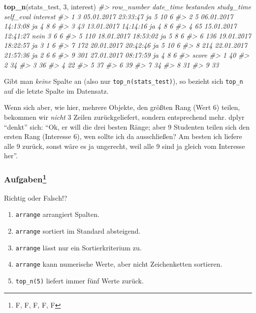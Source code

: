 \documentclass[12pt,ngerman,]{book}
\makeatletter
\newenvironment{Shaded}{\begin{snugshade}}{\end{snugshade}}
\newcommand{\KeywordTok}[1]{\textcolor[rgb]{0.13,0.29,0.53}{\textbf{#1}}}
\newcommand{\DecValTok}[1]{\textcolor[rgb]{0.00,0.00,0.81}{#1}}
\newcommand{\CommentTok}[1]{\textcolor[rgb]{0.56,0.35,0.01}{\textit{#1}}}
\newcommand{\NormalTok}[1]{#1}
\providecommand{\tightlist}{%
  \setlength{\itemsep}{0pt}\setlength{\parskip}{0pt}}
\let\rmarkdownfootnote\footnote%
\def\footnote{\protect\rmarkdownfootnote}
\newenvironment{kframe}{%
\medskip{}
\setlength{\fboxsep}{.8em}
 \def\at@end@of@kframe{}%
 \ifinner\ifhmode%
  \def\at@end@of@kframe{\end{minipage}}%
  \begin{minipage}{\columnwidth}%
 \fi\fi%
 \def\FrameCommand##1{\hskip\@totalleftmargin \hskip-\fboxsep
 \colorbox{shadecolor}{##1}\hskip-\fboxsep
     \hskip-\linewidth \hskip-\@totalleftmargin \hskip\columnwidth}%
 \MakeFramed {\advance\hsize-\width
   \@totalleftmargin\z@ \linewidth\hsize
   \@setminipage}}%
 {\par\unskip\endMakeFramed%
 \at@end@of@kframe}
\renewenvironment{Shaded}{\begin{kframe}}{\end{kframe}}
\theoremstyle{definition}
\theoremstyle{definition}
\theoremstyle{remark}
\let\BeginKnitrBlock\begin \let\EndKnitrBlock\end
\makeatother
\begin{document}
\begin{Shaded}
\begin{Highlighting}[]


\KeywordTok{top_n}\NormalTok{(stats_test, }\DecValTok{3}\NormalTok{, interest)}
\CommentTok{#>   row_number           date_time bestanden study_time self_eval interest}
\CommentTok{#> 1          3 05.01.2017 23:33:47        ja          5        10        6}
\CommentTok{#> 2          5 06.01.2017 14:13:08        ja          4         8        6}
\CommentTok{#> 3         43 13.01.2017 14:14:16        ja          4         8        6}
\CommentTok{#> 4         65 15.01.2017 12:41:27      nein          3         6        6}
\CommentTok{#> 5        110 18.01.2017 18:53:02        ja          5         8        6}
\CommentTok{#> 6        136 19.01.2017 18:22:57        ja          3         1        6}
\CommentTok{#> 7        172 20.01.2017 20:42:46        ja          5        10        6}
\CommentTok{#> 8        214 22.01.2017 21:57:36        ja          2         6        6}
\CommentTok{#> 9        301 27.01.2017 08:17:59        ja          4         8        6}
\CommentTok{#>   score}
\CommentTok{#> 1    40}
\CommentTok{#> 2    34}
\CommentTok{#> 3    36}
\CommentTok{#> 4    22}
\CommentTok{#> 5    37}
\CommentTok{#> 6    39}
\CommentTok{#> 7    34}
\CommentTok{#> 8    31}
\CommentTok{#> 9    33}
\end{Highlighting}
\end{Shaded}

Gibt man \emph{keine} Spalte an (also nur \texttt{top\_n(stats\_test)}),
so bezieht sich \texttt{top\_n} auf die letzte Spalte im Datensatz.

Wenn sich aber, wie hier, mehrere Objekte, den größten Rang (Wert 6)
teilen, bekommen wir \emph{nicht} 3 Zeilen zurückgeliefert, sondern
entsprechend mehr. dplyr ``denkt'' sich: ``Ok, er will die drei besten
Ränge; aber 9 Studenten teilen sich den ersten Rang (Interesse 6), wen
sollte ich da ausschließen? Am besten ich liefere alle 9 zurück, sonst
wäre es ja ungerecht, weil alle 9 sind ja gleich vom Interesse her''.

\subsubsection[Aufgaben]{\texorpdfstring{Aufgaben\footnote{F, F, F, F, F}}{Aufgaben}}\label{aufgaben-4}

\BeginKnitrBlock{rmdexercises}
Richtig oder Falsch!?

\begin{enumerate}
\def\labelenumi{\arabic{enumi}.}
\tightlist
\item
  \texttt{arrange} arrangiert Spalten.
\item
  \texttt{arrange} sortiert im Standard absteigend.
\item
  \texttt{arrange} lässt nur ein Sortierkriterium zu.
\item
  \texttt{arrange} kann numerische Werte, aber nicht Zeichenketten
  sortieren.
\item
  \texttt{top\_n(5)} liefert immer fünf Werte zurück.
\end{enumerate}
\EndKnitrBlock{rmdexercises}
\end{document}
